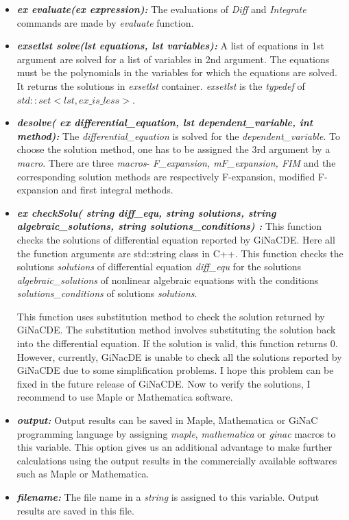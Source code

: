\documentclass[prd,aps,floats,showkeys,nofootinbib,notitlepage]{revtex4-2}
\begin{document}
\begin{itemize}
		\item[] {\em \textbf{ex evaluate(ex expression):}} The evaluations of {\em Diff} and {\em Integrate} commands are made by {\em evaluate} function.
		
		\item[] {\em \textbf{exsetlst solve(lst equations, lst variables):}} A list of equations in 1st argument are solved for a list of variables in 2nd argument. The equations must be the polynomials in the variables for which the equations are solved. It returns the solutions in {\em exsetlst} container. {\em exsetlst} is the {\em typedef} of ${ std::set< lst,ex\_is\_less>}$.  
		
		\item[] {\em \textbf{desolve( ex differential\_equation, lst dependent\_variable, int method):}} The {\em differential\_equation} is solved for the {\em dependent\_variable}. To choose the solution method, one has to be assigned the 3rd argument by a {\em macro}. There are three {\em macros}- {\em F\_expansion, mF\_expansion, FIM} and the corresponding solution methods are respectively F-expansion, modified F-expansion and first integral methods. 
		
		\item[] {\em \textbf{ex checkSolu( string diff\_equ, string solutions, string algebraic\_solutions, string solutions\_conditions)
		:}}  This function checks the solutions of differential equation reported by GiNaCDE. Here all the function arguments are std::string class in C++. This function checks the solutions \textit{solutions} of differential equation \textit{diff\_equ} for the solutions \textit{algebraic\_solutions} of nonlinear algebraic equations with the conditions \textit{solutions\_conditions} of solutions \textit{solutions}.
	
	   This function uses substitution method to check the solution returned by GiNaCDE. The substitution method involves substituting the solution back into the differential equation. If the solution is valid, this function returns $0$. However, currently, GiNacDE is unable to check all the solutions reported by GiNaCDE due to some simplification problems. I hope this problem can be fixed in the future release of GiNaCDE. Now to verify the solutions, I recommend to use Maple or Mathematica software.
		
		\item[] {\em \textbf{output:}} Output results can be saved in Maple, Mathematica or GiNaC programming language by assigning {\em maple}, {\em mathematica}
		 or {\em ginac} {macros} to this variable. This option gives us an additional advantage to make further calculations using the output results in the commercially available softwares such as {Maple} or {Mathematica}.
		
		\item[] {\em \textbf{filename:}} The file name in a {\em string} is assigned to this variable. Output results are saved in this file. 
	\end{itemize}
	
\end{document}
